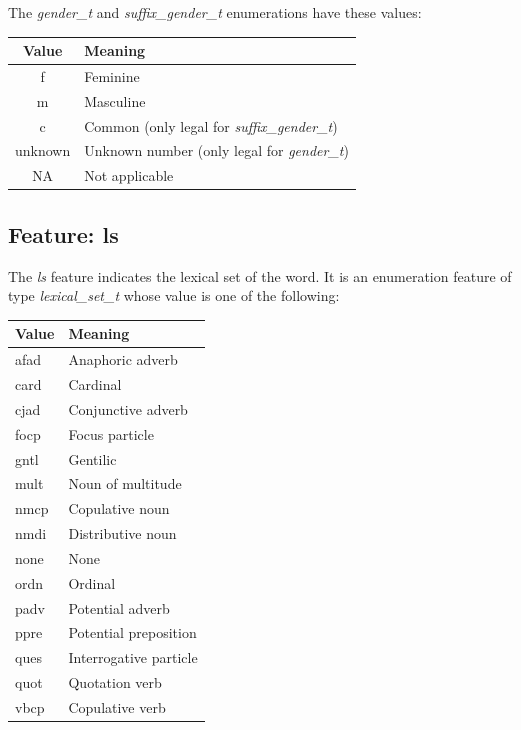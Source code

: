 \documentclass[11pt,oneside,a4paper]{memoir}
\begin{document}
The \emph{gender\_t} and \emph{suffix\_gender\_t} enumerations have these values:

\begin{center}
  \begin{tabular}{cl}
    \textbf{Value} & \textbf{Meaning}\\
    \hline
    f & Feminine\\
    m & Masculine\\
    c & Common (only legal for \emph{suffix\_gender\_t})\\
    unknown & Unknown number (only legal for \emph{gender\_t})\\
    NA & Not applicable\\
  \end{tabular}
\end{center}


\subsection{Feature: ls}

The \emph{ls} feature indicates the lexical set of the word. It is an enumeration feature of type
\emph{lexical\_set\_t} whose value is one of the following:

\begin{center}
  \begin{tabular}{ll}
    \textbf{Value} & \textbf{Meaning}\\
    \hline
    afad & Anaphoric adverb\\
    card & Cardinal\\
    cjad & Conjunctive adverb\\
    focp & Focus particle\\
    gntl & Gentilic\\
    mult & Noun of multitude\\
    nmcp & Copulative noun\\
    nmdi & Distributive noun\\
    none & None\\
    ordn & Ordinal\\
    padv & Potential adverb\\
    ppre & Potential preposition\\
    ques & Interrogative particle\\
    quot & Quotation verb\\
    vbcp & Copulative verb\\
  \end{tabular}
\end{center}
\end{document}
